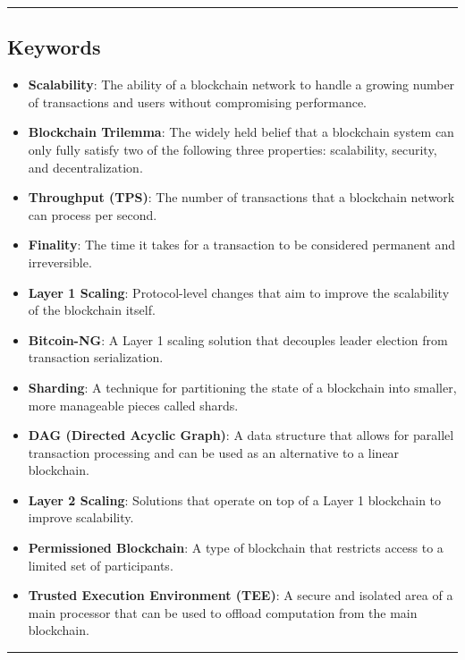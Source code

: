 \begin{center}\rule{0.5\linewidth}{0.5pt}\end{center}

\subsection{Keywords}\label{keywords}

\begin{itemize}
\tightlist
\item
  \textbf{Scalability}: The ability of a blockchain network to handle a
  growing number of transactions and users without compromising
  performance.
\item
  \textbf{Blockchain Trilemma}: The widely held belief that a blockchain
  system can only fully satisfy two of the following three properties:
  scalability, security, and decentralization.
\item
  \textbf{Throughput (TPS)}: The number of transactions that a
  blockchain network can process per second.
\item
  \textbf{Finality}: The time it takes for a transaction to be
  considered permanent and irreversible.
\item
  \textbf{Layer 1 Scaling}: Protocol-level changes that aim to improve
  the scalability of the blockchain itself.
\item
  \textbf{Bitcoin-NG}: A Layer 1 scaling solution that decouples leader
  election from transaction serialization.
\item
  \textbf{Sharding}: A technique for partitioning the state of a
  blockchain into smaller, more manageable pieces called shards.
\item
  \textbf{DAG (Directed Acyclic Graph)}: A data structure that allows
  for parallel transaction processing and can be used as an alternative
  to a linear blockchain.
\item
  \textbf{Layer 2 Scaling}: Solutions that operate on top of a Layer 1
  blockchain to improve scalability.
\item
  \textbf{Permissioned Blockchain}: A type of blockchain that restricts
  access to a limited set of participants.
\item
  \textbf{Trusted Execution Environment (TEE)}: A secure and isolated
  area of a main processor that can be used to offload computation from
  the main blockchain.
\end{itemize}

\begin{center}\rule{0.5\linewidth}{0.5pt}\end{center}

